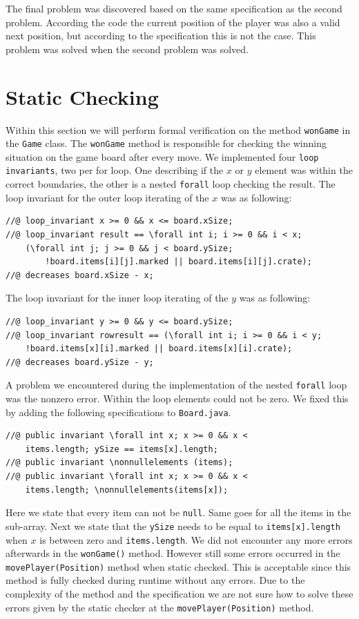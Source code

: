 \documentclass[a4paper]{article}
\begin{document}
	The final problem was discovered based on the same specification as the second problem. According the code the current position of the player was also a valid next position, but according to the specification this is not the case. This problem was solved when the second problem was solved.
	
	\newpage
	\section{Static Checking}
	\label{sec:staticchecking}
	Within this section we will perform formal verification on the method \texttt{wonGame} in the \texttt{Game} class. The \texttt{wonGame} method is responsible for checking the winning situation on the game board after every move.
	\newline 
	We implemented four \texttt{loop invariants}, two per for loop. One describing if the $x$ or $y$ element was within the correct boundaries, the other is a nested \texttt{forall} loop checking the result. The loop invariant for the outer loop iterating of the $x$ was as following:
	\begin{lstlisting}
//@ loop_invariant x >= 0 && x <= board.xSize;
//@ loop_invariant result == \forall int i; i >= 0 && i < x; 
	(\forall int j; j >= 0 && j < board.ySize; 
		!board.items[i][j].marked || board.items[i][j].crate);
//@ decreases board.xSize - x;
	\end{lstlisting}
	The loop invariant for the inner loop iterating of the $y$ was as following:
	\begin{lstlisting}
//@ loop_invariant y >= 0 && y <= board.ySize;
//@ loop_invariant rowresult == (\forall int i; i >= 0 && i < y; 
	!board.items[x][i].marked || board.items[x][i].crate);
//@ decreases board.ySize - y;
	\end{lstlisting}
	
	A problem we encountered during the implementation of the nested \texttt{forall} loop was the nonzero error. Within the loop elements could not be zero. We fixed this by adding the following specifications to \texttt{Board.java}.
	\begin{lstlisting}
//@ public invariant \forall int x; x >= 0 && x <
    items.length; ySize == items[x].length;
//@ public invariant \nonnullelements (items);
//@ public invariant \forall int x; x >= 0 && x <
    items.length; \nonnullelements(items[x]);	
	\end{lstlisting}
	Here we state that every item can not be \texttt{null}. Same goes for all the items in the sub-array. Next we state that the \texttt{ySize} needs to be equal to \texttt{items[x].length} when $x$ is between zero and \texttt{items.length}. 
	\newline
	We did not encounter any more errors afterwards in the \texttt{wonGame()} method. However still some errors occurred in the \texttt{movePlayer(Position)} method when static checked. This is acceptable since this method is fully checked during runtime without any errors. Due to the complexity of the method and the specification we are not sure how to solve these errors given by the static checker at the \texttt{movePlayer(Position)} method.
	
\end{document}
